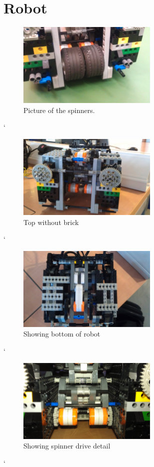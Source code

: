 \section{Robot}
\label{apx:robot}

\begin{figure}[h]
  \caption{Picture of the spinners.}
  \label{fig:spinners}
  \centering
    \includegraphics[width=0.6\textwidth]{constructionPics/IMAG0166-001.jpg}
\end{figure}`


\begin{figure}[h]
  \caption{Top without brick}
  \centering
    \includegraphics[width=0.6\textwidth]{constructionPics/IMAG0219-001.jpg}
\end{figure}`


\begin{figure}[h]
  \caption{Showing bottom of robot}
  \centering
    \includegraphics[width=0.6\textwidth]{constructionPics/IMAG0218-001.jpg}
\end{figure}`


\begin{figure}[h]
  \caption{Showing spinner drive detail}
  \centering
    \includegraphics[width=0.6\textwidth]{constructionPics/IMAG0217-001.jpg}
\end{figure}`

